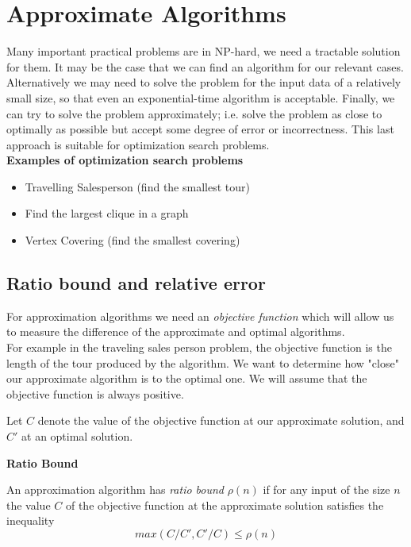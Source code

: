 \section{Approximate Algorithms}
Many important practical problems are in NP-hard,
we need a tractable solution for them.
It may be the case that we can find an algorithm for our relevant cases.
Alternatively we may need to solve the problem for the input
data of a relatively small size, so that even an exponential-time algorithm is acceptable.
Finally, we can try to solve the problem approximately;
i.e. solve the problem as close to optimally as possible but accept some degree of error
or incorrectness.
This last approach is suitable for optimization search problems.\\

\textbf{Examples of optimization search problems}
\begin{itemize}
    \item Travelling Salesperson (find the smallest tour)
    \item Find the largest clique in a graph
    \item Vertex Covering (find the smallest covering)
\end{itemize}

\subsection{Ratio bound and relative error}
For approximation algorithms we need an \textit{objective function}
which will allow us to measure the difference of the approximate and optimal algorithms.\\

For example in the traveling sales person problem,
the objective function is the length of the tour produced by the algorithm.
We want to determine how "close" our approximate algorithm is to the optimal one.
We will assume that the objective function is always positive.

\begin{definition}
    Let $C$ denote the value of the objective function at our approximate solution,
    and $C\prime$ at an optimal solution.
\end{definition}

\textbf{Ratio Bound}
\begin{definition}
    An approximation algorithm has \textit{ratio bound} $\rho(n)$
    if for any input of the size $n$ the value $C$ of the objective function
    at the approximate solution satisfies the inequality
    $$max(C/C\prime, C\prime/C) \leq \rho(n)$$
\end{definition}

